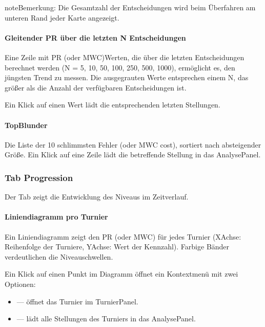 \documentclass[letterpaper,10pt,german]{sphinxmanual}
\begin{document}
\begin{sphinxadmonition}{note}{Bemerkung:}
\sphinxAtStartPar
Die Gesamtzahl der Entscheidungen wird beim Überfahren am unteren Rand jeder Karte angezeigt.
\end{sphinxadmonition}


\paragraph{Gleitender PR über die letzten N Entscheidungen}
\label{\detokenize{manuel:pr-glissant-sur-n-dernieres-decisions}}
\sphinxAtStartPar
Eine Zeile mit PR\sphinxhyphen{} (oder MWC\sphinxhyphen{})Werten, die über die letzten  Entscheidungen berechnet werden (N = 5, 10, 50, 100, 250, 500, 1000), ermöglicht es, den jüngsten Trend zu messen. Die ausgegrauten Werte entsprechen einem N, das größer als die Anzahl der verfügbaren Entscheidungen ist.

\sphinxAtStartPar
Ein Klick auf einen Wert lädt die entsprechenden letzten  Stellungen.


\paragraph{Top\sphinxhyphen{}Blunder}
\label{\detokenize{manuel:top-blunders}}
\sphinxAtStartPar
Die Liste der 10 schlimmsten Fehler (oder MWC cost), sortiert nach absteigender Größe. Ein Klick auf eine Zeile lädt die betreffende Stellung in das Analyse\sphinxhyphen{}Panel.


\subsubsection{Tab Progression}
\label{\detokenize{manuel:onglet-progression}}
\sphinxAtStartPar
Der Tab  zeigt die Entwicklung des Niveaus im Zeitverlauf.


\paragraph{Liniendiagramm pro Turnier}
\label{\detokenize{manuel:courbe-par-tournoi}}
\sphinxAtStartPar
Ein Liniendiagramm zeigt den PR (oder MWC) für jedes Turnier (X\sphinxhyphen{}Achse: Reihenfolge der Turniere, Y\sphinxhyphen{}Achse: Wert der Kennzahl). Farbige Bänder verdeutlichen die Niveauschwellen.

\sphinxAtStartPar
Ein Klick auf einen Punkt im Diagramm öffnet ein Kontextmenü mit zwei Optionen:
\begin{itemize}
\item {} 
\sphinxAtStartPar
{} — öffnet das Turnier im Turnier\sphinxhyphen{}Panel.

\item {} 
\sphinxAtStartPar
{} — lädt alle Stellungen des Turniers in das Analyse\sphinxhyphen{}Panel.

\end{itemize}
\end{document}
